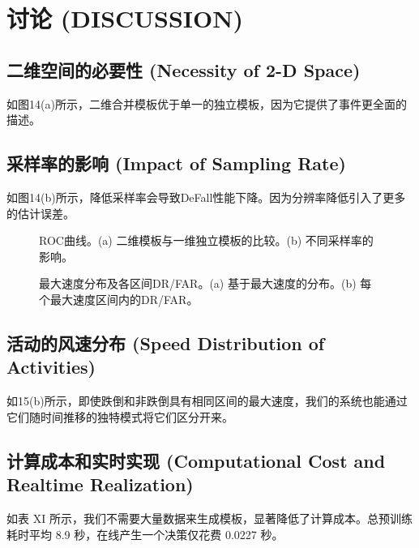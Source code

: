 \documentclass[journal]{IEEEtran}
\begin{document}
\section{讨论 (DISCUSSION)}
\subsection{二维空间的必要性 (Necessity of 2-D Space)}
如图14(a)所示，二维合并模板优于单一的独立模板，因为它提供了事件更全面的描述。

\subsection{采样率的影响 (Impact of Sampling Rate)}
如图14(b)所示，降低采样率会导致DeFall性能下降。因为分辨率降低引入了更多的估计误差。

\begin{figure}[htbp]
\centering
\vspace{4cm} %
\caption{ROC曲线。(a) 二维模板与一维独立模板的比较。(b) 不同采样率的影响。}
\end{figure}

\begin{figure}[htbp]
\centering
\vspace{4cm} %
\caption{最大速度分布及各区间DR/FAR。(a) 基于最大速度的分布。(b) 每个最大速度区间内的DR/FAR。}
\end{figure}

\subsection{活动的风速分布 (Speed Distribution of Activities)}
如15(b)所示，即使跌倒和非跌倒具有相同区间的最大速度，我们的系统也能通过它们随时间推移的独特模式将它们区分开来。

\subsection{计算成本和实时实现 (Computational Cost and Realtime Realization)}
如表 XI 所示，我们不需要大量数据来生成模板，显著降低了计算成本。总预训练耗时平均 8.9 秒，在线产生一个决策仅花费 0.0227 秒。
\end{document}
